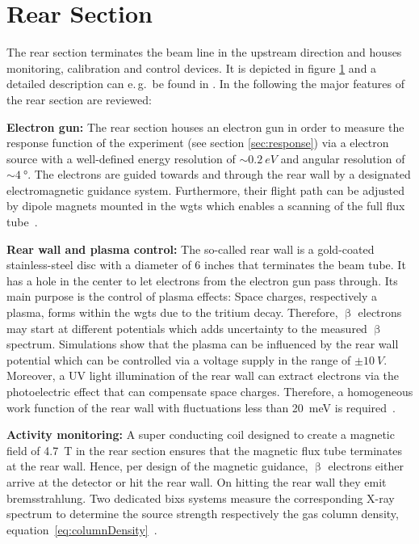 \section{Rear Section}
\label{sec:katrinExpSetupRearSection}
\begin{figure}[t]
 \label{fig:rearSection}
\end{figure}

The rear section terminates the beam line in the upstream direction and houses monitoring, calibration and control devices. It is depicted in figure \ref{fig:rearSection} and a detailed description can e.\,g.~be found in \cite{Babutzka2014}. In the following the major features of the rear section are reviewed:

{\par\textbf{Electron gun:}
The rear section houses an electron gun in order to measure the response function of the experiment (see section \ref{sec:response}) via a electron source with a well-defined energy resolution of $\sim \SI{0.2}{eV}$ and angular resolution of $\sim \SI{4}{\degree}$. The electrons are guided towards and through the rear wall by a designated electromagnetic guidance system. Furthermore, their flight path can be adjusted by dipole magnets mounted in the \gls{wgts} which enables a scanning of the full flux tube~\cite{Babutzka2014}.}

{\par \textbf{Rear wall and plasma control:}
The so-called rear wall is a gold-coated stainless-steel disc with a diameter of 6 inches that terminates the beam tube. It has a hole in the center to let electrons from the electron gun pass through. Its main purpose is the control of plasma effects: Space charges, respectively a plasma, forms within the \gls{wgts} due to the tritium decay. Therefore, $\upbeta$ electrons may start at different potentials which adds uncertainty to the measured $\upbeta$ spectrum. Simulations show that the plasma can be influenced by the rear wall potential which can be controlled via a voltage supply in the range of $\pm \SI{10}{V}$. Moreover, a UV light illumination of the rear wall can extract electrons via the photoelectric effect that can compensate space charges. Therefore, a homogeneous work function of the rear wall with fluctuations less than \SI{20}{meV} is required~\cite{Kuckert2018, Kuckert2016}.}

{\par\textbf{Activity monitoring:}
A super conducting coil designed to create a magnetic field of \SI{4.7}{T} in the rear section ensures that the magnetic flux tube terminates at the rear wall. Hence, per design of the magnetic guidance, $\upbeta$ electrons either arrive at the detector or hit the rear wall. On hitting the rear wall they emit bremsstrahlung. Two dedicated \gls{bixs} systems measure the corresponding X-ray spectrum to determine the source strength respectively the gas column density, equation~\eqref{eq:columnDensity}~\cite{Roellig2015}.}
